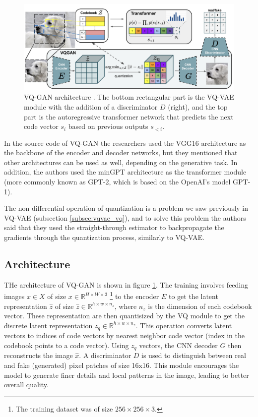 \begin{figure}
    \centering
    \includegraphics[width=\textwidth]{images/vqgan_architecture.png}
    \caption{VQ-GAN architecture \cite{vqgan}. The bottom rectangular part is the VQ-VAE module with the addition of a discriminator $D$ (right), and the top part is the autoregressive transformer network that predicts the next code vector $s_i$ based on previous outputs $s_{<i}$.}
    \label{fig:vqgan_architecture}
\end{figure}

In the source code of VQ-GAN the researchers used the VGG16 \cite{vgg16} architecture as the backbone of the encoder and decoder networks, but they mentioned that other architectures can be used as well, depending on the generative task. In addition, the authors used the minGPT \cite{mingpt} architecture as the transformer module (more commonly known as GPT-2, which is based on the OpenAI's model GPT-1).

The non-differential operation of quantization is a problem we saw previously in VQ-VAE (subsection \ref{subsec:vqvae_vq}), and to solve this problem the authors said that they used the straight-through estimator \cite{ste} to backpropagate the gradients through the quantization process, similarly to VQ-VAE.






\subsection{Architecture}

THe architecture of VQ-GAN is shown in figure \ref{fig:vqgan_architecture}. The training involves feeding images $x \in X$ of size $x \in \mathbb{R}^{H \times W \times 3}$ \footnote[2]{The training dataset was of size $256 \times 256 \times 3$.} to the encoder $E$ to get the latent representation $\hat{z}$ of size $\hat{z} \in \mathbb{R}^{h \times w \times n_z}$, where $n_z$ is the dimension of each codebook vector. These representation are then quantisized by the VQ module to get the discrete latent representation $z_q \in \mathbb{R}^{h \times w \times n_z}$. This operation converts latent vectors to indices of code vectors by nearest neighbor code vector (index in the codebook points to a code vector). Using $z_q$ vectors, the CNN decoder $G$ then reconstructs the image $\hat{x}$. A discriminator $D$ is used to distinguish between real and fake (generated) pixel patches of size 16x16. This module encourages the model to generate finer details and local patterns in the image, leading to better overall quality.

